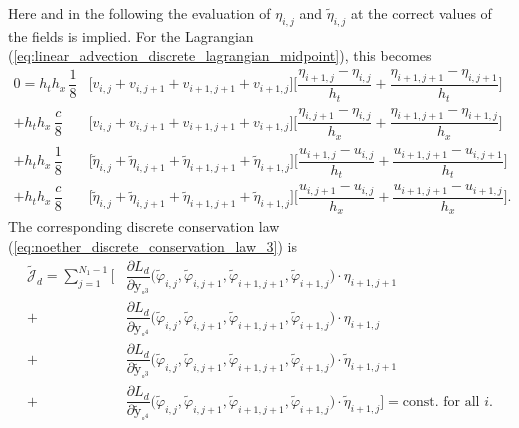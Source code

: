 \documentclass[12pt,a4paper,reqno]{article}
\begin{document}
\endgroup
Here and in the following the evaluation of $\eta_{i,j}$ and $\tilde{\eta}_{i,j}$ at the correct values of the fields is implied.
For the Lagrangian (\ref{eq:linear_advection_discrete_lagrangian_midpoint}), this becomes
\begingroup
\allowdisplaybreaks
\begin{align}\label{eq:linear_advection_discrete_symmetry_condition_2}
0
\nonumber
= h_{t} h_{x} \, \dfrac{1}{8} & \bigg[ v_{i,j} + v_{i,j+1} + v_{i+1,j+1} + v_{i+1,j} \bigg]
\bigg[
   \dfrac{\eta_{i+1,j  } - \eta_{i,  j  }}{h_{t}}
 + \dfrac{\eta_{i+1,j+1} - \eta_{i,  j+1}}{h_{t}}
\bigg]
\\
\nonumber
+ h_{t} h_{x} \, \dfrac{c}{8} & \bigg[ v_{i,j} + v_{i,j+1} + v_{i+1,j+1} + v_{i+1,j} \bigg]
\bigg[
   \dfrac{\eta_{i,  j+1} - \eta_{i,  j  }}{h_{x}}
 + \dfrac{\eta_{i+1,j+1} - \eta_{i+1,j  }}{h_{x}}
\bigg]
\\
\nonumber
+ h_{t} h_{x} \, \dfrac{1}{8} & \bigg[
   \tilde{\eta}_{i,  j  }
 + \tilde{\eta}_{i,  j+1}
 + \tilde{\eta}_{i+1,j+1}
 + \tilde{\eta}_{i+1,j  }
\bigg]
\bigg[
   \dfrac{u_{i+1,j  } - u_{i,j  }}{h_{t}}
 + \dfrac{u_{i+1,j+1} - u_{i,j+1}}{h_{t}} 
\bigg]
\\
+ h_{t} h_{x} \, \dfrac{c}{8} & \bigg[ 
   \tilde{\eta}_{i,  j  }
 + \tilde{\eta}_{i,  j+1}
 + \tilde{\eta}_{i+1,j+1}
 + \tilde{\eta}_{i+1,j  }
\bigg]
\bigg[
   \dfrac{u_{i,  j+1} - u_{i,  j}}{h_{x}}
 + \dfrac{u_{i+1,j+1} - u_{i+1,j}}{h_{x}}
\bigg] .
\end{align}
\endgroup
The corresponding discrete conservation law (\ref{eq:noether_discrete_conservation_law_3}) is
\begingroup
\allowdisplaybreaks
\begin{align}\label{eq:linear_advection_discrete_conservation_law_1}
\tilde{\mathcal{J}}_{d} =
\sum \limits_{j=1}^{N_{1}-1} \bigg[
\nonumber
 & \dfrac{\partial L_d}{\partial {\ensuremath{{\ensuremath{\mathrm{{y}}}}}}_{\square^3}} \Big( \tilde{\ensuremath{\varphi}}_{i,   j}, \tilde{\ensuremath{\varphi}}_{i,   j+1}, \tilde{\ensuremath{\varphi}}_{i+1, j+1}, \tilde{\ensuremath{\varphi}}_{i+1, j} \Big) \cdot \eta_{i+1,j+1}
\\
\nonumber
+& \dfrac{\partial L_d}{\partial {\ensuremath{{\ensuremath{\mathrm{{y}}}}}}_{\square^4}} \Big( \tilde{\ensuremath{\varphi}}_{i,   j}, \tilde{\ensuremath{\varphi}}_{i,   j+1}, \tilde{\ensuremath{\varphi}}_{i+1, j+1}, \tilde{\ensuremath{\varphi}}_{i+1, j} \Big) \cdot \eta_{i+1,j  }
\\
\nonumber
+& \dfrac{\partial L_d}{\partial \tilde{\ensuremath{{\ensuremath{\mathrm{{y}}}}}}_{\square^3}} \Big( \tilde{\ensuremath{\varphi}}_{i,   j}, \tilde{\ensuremath{\varphi}}_{i,   j+1}, \tilde{\ensuremath{\varphi}}_{i+1, j+1}, \tilde{\ensuremath{\varphi}}_{i+1, j} \Big) \cdot \tilde{\eta}_{i+1,j+1}
\\
+& \dfrac{\partial L_d}{\partial \tilde{\ensuremath{{\ensuremath{\mathrm{{y}}}}}}_{\square^4}} \Big( \tilde{\ensuremath{\varphi}}_{i,   j}, \tilde{\ensuremath{\varphi}}_{i,   j+1}, \tilde{\ensuremath{\varphi}}_{i+1, j+1}, \tilde{\ensuremath{\varphi}}_{i+1, j} \Big) \cdot \tilde{\eta}_{i+1,j  }
\bigg] = \text{const. for all $i$} .
\end{align}
\end{document}
